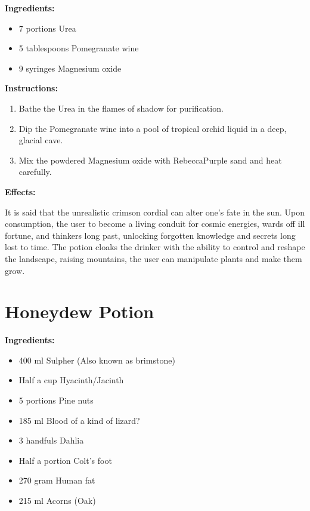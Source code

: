 \documentclass{article}
\begin{document}
\textbf{Ingredients:}

\begin{itemize}
  \item 7 portions Urea
  \item 5 tablespoons Pomegranate wine
  \item 9 syringes Magnesium oxide
\end{itemize}

\textbf{Instructions:}

\begin{enumerate}
  \item Bathe the Urea in the flames of shadow for purification.
  \item Dip the Pomegranate wine into a pool of tropical orchid liquid in a deep, glacial cave.
  \item Mix the powdered Magnesium oxide with RebeccaPurple sand and heat carefully.
\end{enumerate}

\textbf{Effects:}

It is said that the unrealistic crimson cordial can alter one's fate in the sun. Upon consumption, the user to become a living conduit for cosmic energies, wards off ill fortune, and thinkers long past, unlocking forgotten knowledge and secrets long lost to time. The potion cloaks the drinker with the ability to control and reshape the landscape, raising mountains, the user can manipulate plants and make them grow.

\newpage
\section*{Honeydew Potion}

\textbf{Ingredients:}

\begin{itemize}
  \item 400 ml Sulpher (Also known as brimstone)
  \item Half a cup Hyacinth/Jacinth
  \item 5 portions Pine nuts
  \item 185 ml Blood of a kind of lizard?
  \item 3 handfuls Dahlia
  \item Half a portion Colt's foot
  \item 270 gram Human fat
  \item 215 ml Acorns (Oak)
\end{itemize}
\end{document}
